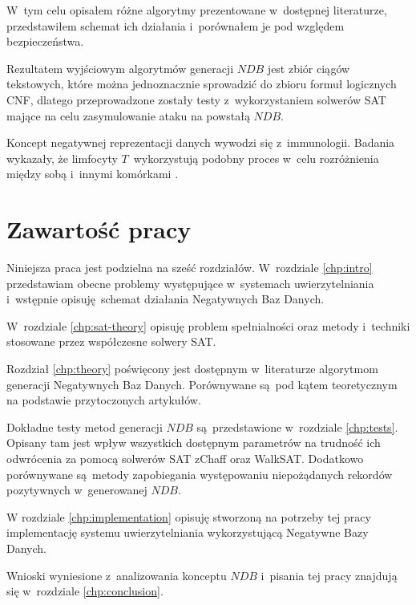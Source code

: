 W~tym celu opisałem różne algorytmy prezentowane w~dostępnej literaturze, przedstawiłem schemat ich działania i~porównałem
je pod względem bezpieczeństwa. 

Rezultatem wyjściowym algorytmów generacji $NDB$ jest zbiór ciągów tekstowych, które można jednoznacznie sprowadzić 
do zbioru formuł logicznych CNF, dlatego przeprowadzone zostały testy z~wykorzystaniem solwerów SAT mające na celu 
zasymulowanie ataku na powstałą $NDB$.

Koncept negatywnej reprezentacji danych wywodzi się z~immunologii. Badania wykazały, że limfocyty $T$~wykorzystują
podobny proces w~celu rozróżnienia między sobą i~innymi komórkami \cite{T-cells}.

\section{Zawartość pracy}
Niniejsza praca jest podzielna na sześć rozdziałów. W~rozdziale \ref{chp:intro} przedstawiam obecne problemy występujące w~systemach uwierzytelniania i~wstępnie opisuję schemat działania Negatywnych Baz Danych.

W~rozdziale \ref{chp:sat-theory} opisuję problem spełnialności oraz metody i~techniki stosowane przez współczesne solwery SAT.

Rozdział \ref{chp:theory} poświęcony jest dostępnym w~literaturze algorytmom generacji Negatywnych Baz Danych. Porównywane są pod kątem teoretycznym na podstawie przytoczonych artykułów.

Dokładne testy metod generacji $NDB$ są przedstawione w~rozdziale \ref{chp:tests}. Opisany tam jest wpływ wszystkich dostępnym parametrów na trudność ich odwrócenia za pomocą solwerów SAT zChaff oraz WalkSAT.
Dodatkowo porównywane są metody zapobiegania występowaniu niepożądanych rekordów pozytywnych w~generowanej $NDB$.

W rozdziale \ref{chp:implementation} opisuję stworzoną na potrzeby tej pracy implementację systemu uwierzytelniania wykorzystującą Negatywne Bazy Danych.

Wnioski wyniesione z~analizowania konceptu $NDB$ i~pisania tej pracy znajdują się w~rozdziale \ref{chp:conclusion}.















